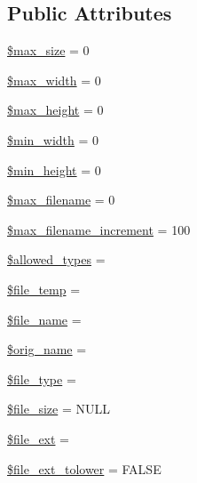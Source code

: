\subsection*{Public Attributes}
\begin{DoxyCompactItemize}
\item 
\mbox{\hyperlink{class_c_i___upload_a3fec414be9f76cb7ba77ed79b784de62}{\$max\+\_\+size}} = 0
\item 
\mbox{\hyperlink{class_c_i___upload_a7f6a5db40a5fd00c8babbd37480b00fc}{\$max\+\_\+width}} = 0
\item 
\mbox{\hyperlink{class_c_i___upload_a7f2b56fde8cdd8907f9228149fc4b9bc}{\$max\+\_\+height}} = 0
\item 
\mbox{\hyperlink{class_c_i___upload_ad481f92f436b46aa9e400c3350c1971d}{\$min\+\_\+width}} = 0
\item 
\mbox{\hyperlink{class_c_i___upload_ade5021b056dd0ca6a46b293851ee8347}{\$min\+\_\+height}} = 0
\item 
\mbox{\hyperlink{class_c_i___upload_a7c8c80e453111c2521e355b83331a9df}{\$max\+\_\+filename}} = 0
\item 
\mbox{\hyperlink{class_c_i___upload_a95a9bbb06c792949b16879a515366b73}{\$max\+\_\+filename\+\_\+increment}} = 100
\item 
\mbox{\hyperlink{class_c_i___upload_a2e0df9e15179e2db66d161206842d6c0}{\$allowed\+\_\+types}} = \textquotesingle{}\textquotesingle{}
\item 
\mbox{\hyperlink{class_c_i___upload_a8b49917820e40f0b8956d95c1fd6ee6e}{\$file\+\_\+temp}} = \textquotesingle{}\textquotesingle{}
\item 
\mbox{\hyperlink{class_c_i___upload_a59bf132c77b5bee5adff2098cc2a6fbc}{\$file\+\_\+name}} = \textquotesingle{}\textquotesingle{}
\item 
\mbox{\hyperlink{class_c_i___upload_a2704f7723b97b03285de219442ae3e2b}{\$orig\+\_\+name}} = \textquotesingle{}\textquotesingle{}
\item 
\mbox{\hyperlink{class_c_i___upload_a6210dfa92a7e2e5e9db1aa2337ce4cd1}{\$file\+\_\+type}} = \textquotesingle{}\textquotesingle{}
\item 
\mbox{\hyperlink{class_c_i___upload_a5b3595a69dbf686d879bd009ec9c0317}{\$file\+\_\+size}} = N\+U\+LL
\item 
\mbox{\hyperlink{class_c_i___upload_a65b080519869bc14d792c1800e3362f5}{\$file\+\_\+ext}} = \textquotesingle{}\textquotesingle{}
\item 
\mbox{\hyperlink{class_c_i___upload_a19d10a169638eedd95a6a85d71146db8}{\$file\+\_\+ext\+\_\+tolower}} = F\+A\+L\+SE

\end{DoxyCompactItemize}
